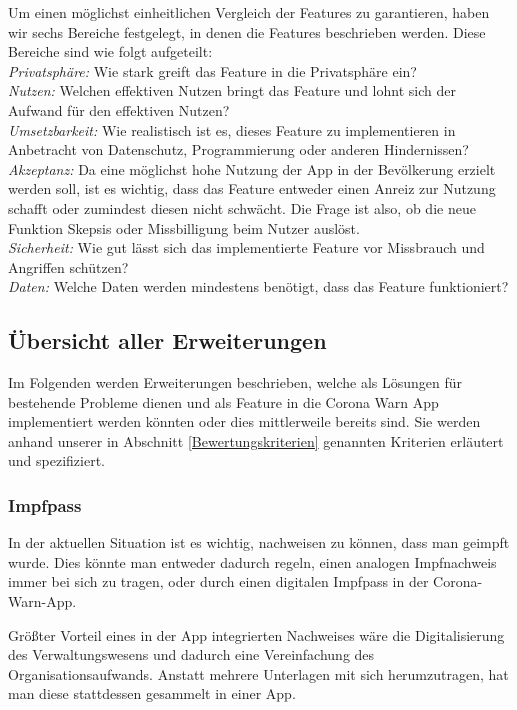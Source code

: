 \documentclass[conference,compsoc]{IEEEtran}
\begin{document}
Um einen möglichst einheitlichen Vergleich der Features zu garantieren, haben wir sechs Bereiche festgelegt, in denen die Features beschrieben werden.
Diese Bereiche sind wie folgt aufgeteilt:\\
\textit{Privatsphäre:} Wie stark greift das Feature in die Privatsphäre ein?\\
\textit{Nutzen:} Welchen effektiven Nutzen bringt das Feature und lohnt sich der Aufwand für den effektiven Nutzen?\\
\textit{Umsetzbarkeit:} Wie realistisch ist es, dieses Feature zu implementieren in Anbetracht von Datenschutz, Programmierung oder anderen Hindernissen?\\
\textit{Akzeptanz:} Da eine möglichst hohe Nutzung der App in der Bevölkerung erzielt werden soll, ist es wichtig, dass das Feature entweder einen Anreiz zur Nutzung schafft oder zumindest diesen nicht schwächt. 
Die Frage ist also, ob die neue Funktion Skepsis oder Missbilligung beim Nutzer auslöst.\\
\textit{Sicherheit:} Wie gut lässt sich das implementierte Feature vor Missbrauch und Angriffen schützen?\\
\textit{Daten:} Welche Daten werden mindestens benötigt, dass das Feature funktioniert?\\


\subsection{Übersicht aller Erweiterungen}

Im Folgenden werden Erweiterungen beschrieben, welche als Lösungen für bestehende Probleme dienen und als Feature in die Corona Warn App implementiert werden könnten oder dies mittlerweile bereits sind. Sie werden anhand unserer in Abschnitt \ref{Bewertungskriterien} genannten Kriterien erläutert und spezifiziert.\\


\subsubsection{Impfpass}
In der aktuellen Situation ist es wichtig, nachweisen zu können, dass man geimpft wurde. 
Dies könnte man entweder dadurch regeln, einen analogen Impfnachweis immer bei sich zu tragen, oder durch einen digitalen Impfpass in der Corona-Warn-App.

Größter Vorteil eines in der App integrierten Nachweises wäre die Digitalisierung des Verwaltungswesens und dadurch eine Vereinfachung des Organisationsaufwands. 
Anstatt mehrere Unterlagen mit sich herumzutragen, hat man diese stattdessen gesammelt in einer App.
\end{document}
